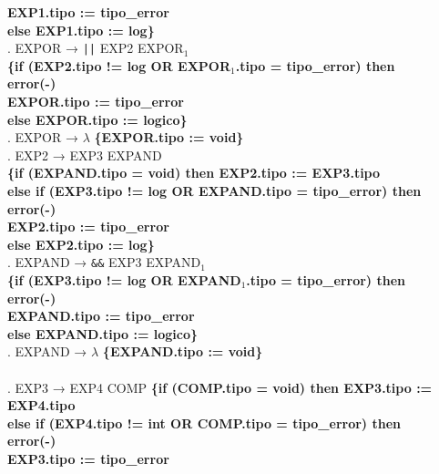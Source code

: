 \begin{tabbing}
    \>                     \> \> \textbf{EXP1.tipo := tipo\_error}\\
    \>                     \> \textbf{else EXP1.tipo := log\}}\\
    . EXPOR → \verb!||! EXP2 EXPOR$_1$\\
    \>                     \>\textbf{\{if (EXP2.tipo != log OR EXPOR$_1$.tipo = tipo\_error) then}\\
    \>                     \> \> \textbf{error(-)}\\
    \>                     \> \> \textbf{EXPOR.tipo := tipo\_error}\\
    \>                     \> \textbf{else EXPOR.tipo := logico\}}\\
    . EXPOR → $\lambda$ \textbf{\{EXPOR.tipo := void\}}\\
    . EXP2 → EXP3 EXPAND\\
    \>                     \>\textbf{\{if (EXPAND.tipo = void) then EXP2.tipo := EXP3.tipo}\\
    \>                     \> \textbf{else if (EXP3.tipo != log OR EXPAND.tipo = tipo\_error) then}\\
    \>                     \> \> \textbf{error(-)}\\
    \>                     \> \> \textbf{EXP2.tipo := tipo\_error}\\
    \>                     \> \textbf{else EXP2.tipo := log\}}\\
    . EXPAND → \verb!&&! EXP3 EXPAND$_1$\\
    \>                     \>\textbf{\{if (EXP3.tipo != log OR EXPAND$_1$.tipo = tipo\_error) then}\\
    \>                     \> \> \textbf{error(-)}\\
    \>                     \> \> \textbf{EXPAND.tipo := tipo\_error}\\
    \>                     \> \textbf{else EXPAND.tipo := logico\}}\\
    . EXPAND → $\lambda$ \textbf{\{EXPAND.tipo := void\}}\\
    \\
    . EXP3 → EXP4 COMP \>\textbf{\{if (COMP.tipo = void) then EXP3.tipo := EXP4.tipo}\\
    \>                     \> \textbf{else if (EXP4.tipo != int OR COMP.tipo = tipo\_error) then}\\
    \>                     \> \> \textbf{error(-)}\\
    \>                     \> \> \textbf{EXP3.tipo := tipo\_error}\\

\end{tabbing}
